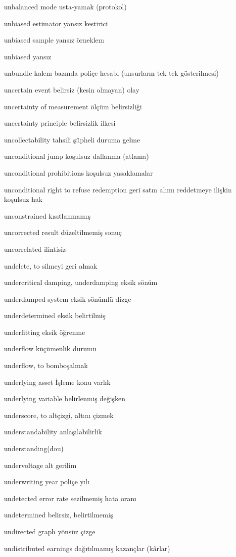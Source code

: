 \documentclass[12pt,fleqn]{article}\usepackage{../../common}
\begin{document}
unbalanced mode usta-yamak (protokol)

unbiased estimator yansız kestirici

unbiased sample yansız örneklem

unbiased yansız

unbundle kalem bazında poliçe hesabı (unsurların tek tek gösterilmesi)

uncertain event belirsiz (kesin olmayan) olay

uncertainty of measurement ölçüm belirsizliği

uncertainty principle belirsizlik ilkesi

uncollectability tahsili şüpheli duruma gelme

unconditional jump koşulsuz dallanma (atlama)

unconditional prohibitions koşulsuz yasaklamalar

unconditional right to refuse redemption geri satın alımı reddetmeye ilişkin koşulsuz hak

unconstrained kısıtlanmamış

uncorrected result düzeltilmemiş sonuç

uncorrelated ilintisiz

undelete, to silmeyi geri almak

undercritical damping, underdamping eksik sönüm

underdamped system eksik sönümlü dizge

underdetermined eksik belirtilmiş

underfitting eksik öğrenme

underflow küçümenlik durumu

underflow, to bomboşalmak

underlying asset İşleme konu varlık

underlying variable belirlenmiş değişken

underscore, to altçizgi, altını çizmek

understandability anlaşılabilirlik

understanding(dou)

undervoltage alt gerilim

underwriting year poliçe yılı

undetected error rate sezilmemiş hata oranı

undetermined belirsiz, belirtilmemiş

undirected graph yönsüz çizge

undistributed earnings dağıtılmamış kazançlar (kârlar)
\end{document}
